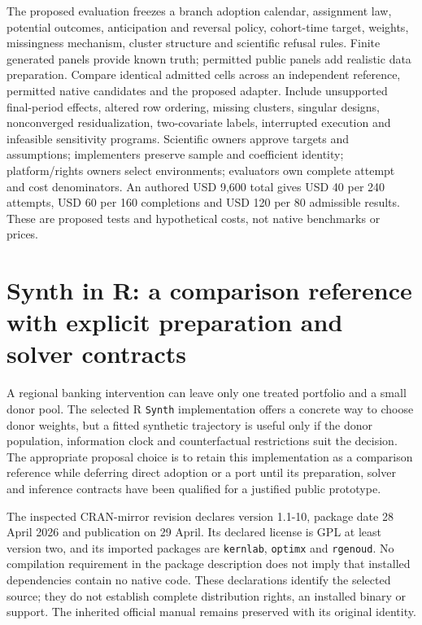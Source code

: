 The proposed evaluation freezes a branch adoption calendar, assignment law,
potential outcomes, anticipation and reversal policy, cohort-time target,
weights, missingness mechanism, cluster structure and scientific refusal
rules. Finite generated panels provide known truth; permitted public panels
add realistic data preparation. Compare identical admitted cells across
an independent reference, permitted native candidates and the proposed
adapter. Include unsupported final-period effects, altered row ordering,
missing clusters, singular designs, nonconverged residualization, two-covariate
labels, interrupted execution and infeasible sensitivity programs.
Scientific owners approve targets and assumptions; implementers preserve
sample and coefficient identity; platform/rights owners select environments;
evaluators own complete attempt and cost denominators. An authored USD 9,600
total gives USD 40 per 240 attempts, USD 60 per 160 completions and USD 120
per 80 admissible results. These are proposed tests and hypothetical costs,
not native benchmarks or prices.~\citep{exec25_panelother_choice}


\section{Synth in R: a comparison reference with explicit preparation and solver contracts}
\label{sec:exec24-synth-reuse}

A regional banking intervention can leave only one treated portfolio and a
small donor pool. The selected R \texttt{Synth} implementation offers a
concrete way to choose donor weights, but a fitted synthetic trajectory is
useful only if the donor population, information clock and counterfactual
restrictions suit the decision. The appropriate proposal choice is to retain
this implementation as a comparison reference while deferring direct adoption
or a port until its preparation, solver and inference contracts have been
qualified for a justified public prototype.
\citep{exec24_synth_choice}

The inspected CRAN-mirror revision declares version 1.1-10, package date
28 April 2026 and publication on 29 April. Its declared license is
GPL at least version two, and its imported packages are \texttt{kernlab},
\texttt{optimx} and \texttt{rgenoud}. No compilation requirement in the
package description does not imply that installed dependencies contain
no native code. These declarations identify the selected source; they do
not establish complete distribution rights, an installed binary or support.
The inherited official manual remains preserved with its original identity.
\citep{exec24_synth_source,v12_sw_synth}

